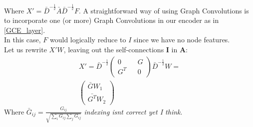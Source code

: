 \documentclass{report}
\begin{document}
	Where $X' = \bar{D}^{-\frac{1}{2}}\bar{A}\bar{D}^{-\frac{1}{2}}F$. A straightforward way of using Graph Convolutions is to incorporate one (or more) Graph Convolutions in our encoder as in \ref{GCE_layer}. \\ In this case, $F$ would logically reduce to $I$ since we have no node features. \\
	Let us rewrite $X'W$, leaving out the self-connections $\mathbf{I}$ in $\mathbf{A}$: 
	\begin{align}
	X' = \bar{D}^{-\frac{1}{2}}
	\left( \begin{matrix} 
	0 && G \\
	G^T && 0
	\end{matrix} \right) \bar{D}^{-\frac{1}{2}}W = \\
	\left(\begin{matrix}
	\bar{G}W_1 \\
	\bar{G^T}W_2
	\end{matrix}\right)\label{highlow}  
	\end{align}
	Where $\bar{G}_{ij} = 
	\frac{G_{ij}}{\sqrt{\sum_i G_{ij} \sum_{j} G_{ij}}}$ \textit{indexing isnt correct yet I think}.
	
\end{document}
